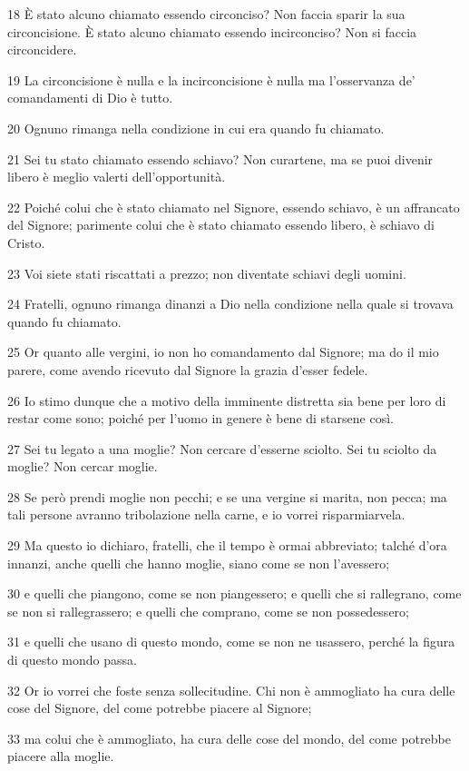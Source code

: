 \par 18 È stato alcuno chiamato essendo circonciso? Non faccia sparir la sua circoncisione. È stato alcuno chiamato essendo incirconciso? Non si faccia circoncidere.
\par 19 La circoncisione è nulla e la incirconcisione è nulla ma l'osservanza de' comandamenti di Dio è tutto.
\par 20 Ognuno rimanga nella condizione in cui era quando fu chiamato.
\par 21 Sei tu stato chiamato essendo schiavo? Non curartene, ma se puoi divenir libero è meglio valerti dell'opportunità.
\par 22 Poiché colui che è stato chiamato nel Signore, essendo schiavo, è un affrancato del Signore; parimente colui che è stato chiamato essendo libero, è schiavo di Cristo.
\par 23 Voi siete stati riscattati a prezzo; non diventate schiavi degli uomini.
\par 24 Fratelli, ognuno rimanga dinanzi a Dio nella condizione nella quale si trovava quando fu chiamato.
\par 25 Or quanto alle vergini, io non ho comandamento dal Signore; ma do il mio parere, come avendo ricevuto dal Signore la grazia d'esser fedele.
\par 26 Io stimo dunque che a motivo della imminente distretta sia bene per loro di restar come sono; poiché per l'uomo in genere è bene di starsene così.
\par 27 Sei tu legato a una moglie? Non cercare d'esserne sciolto. Sei tu sciolto da moglie? Non cercar moglie.
\par 28 Se però prendi moglie non pecchi; e se una vergine si marita, non pecca; ma tali persone avranno tribolazione nella carne, e io vorrei risparmiarvela.
\par 29 Ma questo io dichiaro, fratelli, che il tempo è ormai abbreviato; talché d'ora innanzi, anche quelli che hanno moglie, siano come se non l'avessero;
\par 30 e quelli che piangono, come se non piangessero; e quelli che si rallegrano, come se non si rallegrassero; e quelli che comprano, come se non possedessero;
\par 31 e quelli che usano di questo mondo, come se non ne usassero, perché la figura di questo mondo passa.
\par 32 Or io vorrei che foste senza sollecitudine. Chi non è ammogliato ha cura delle cose del Signore, del come potrebbe piacere al Signore;
\par 33 ma colui che è ammogliato, ha cura delle cose del mondo, del come potrebbe piacere alla moglie.
